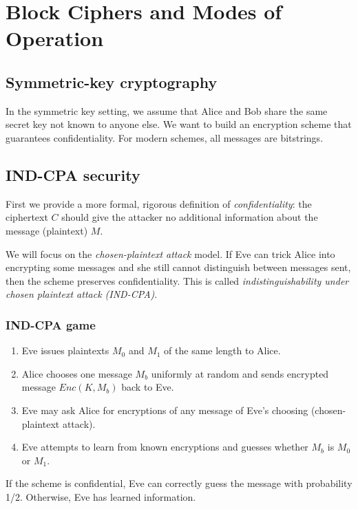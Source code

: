 \chapter{Block Ciphers and Modes of Operation}

\section{Symmetric-key cryptography}
In the symmetric key setting, we assume that Alice and Bob share the same secret key not known to anyone else. We want to build an encryption scheme that guarantees confidentiality. For modern schemes, all messages are bitstrings.

\section{IND-CPA security}
First we provide a more formal, rigorous definition of \emph{confidentiality}: the ciphertext $C$ should give the attacker no additional information about the message (plaintext) $M$.

\medskip

We will focus on the \emph{chosen-plaintext attack} model. If Eve can trick Alice into encrypting some messages and she still cannot distinguish between messages sent, then the scheme preserves confidentiality. This is called \emph{indistinguishability under chosen plaintext attack (IND-CPA)}.

\subsection{IND-CPA game}
\begin{enumerate}
    \item Eve issues plaintexts $M_0$ and $M_1$ of the same length to Alice.
    \item Alice chooses one message $M_b$ uniformly at random and sends encrypted message $Enc(K, M_b)$ back to Eve.
    \item Eve may ask Alice for encryptions of any message of Eve's choosing (chosen-plaintext attack).
    \item Eve attempts to learn from known encryptions and guesses whether $M_b$ is $M_0$ or $M_1$.
\end{enumerate}

If the scheme is confidential, Eve can correctly guess the message with probability 1/2. Otherwise, Eve has learned information.

\medskip

